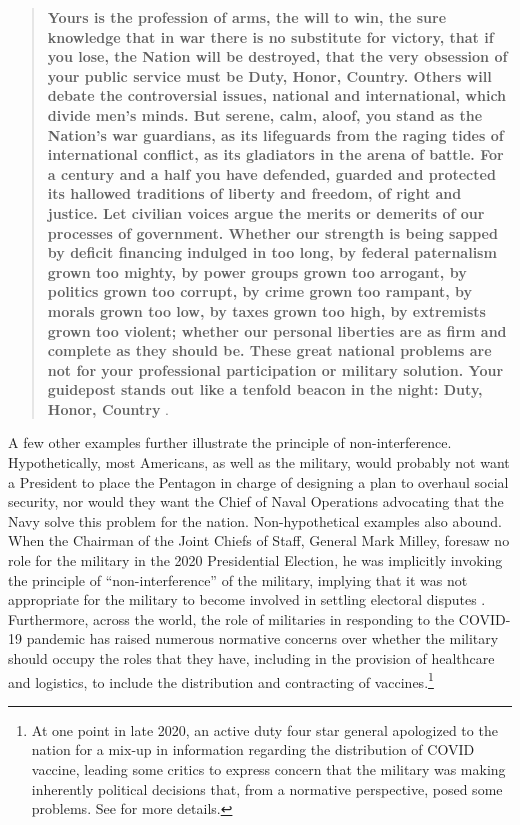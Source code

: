 \documentclass[
  12pt,
  oneside]{memoir}
\begin{document}
\begin{quote}
\textbf{Yours is the profession of arms, the will to win, the sure knowledge that in war there is no substitute for victory, that if you lose, the Nation will be destroyed, that the very obsession of your public service must be Duty, Honor, Country. Others will debate the controversial issues, national and international, which divide men's minds. But serene, calm, aloof, you stand as the Nation's war guardians, as its lifeguards from the raging tides of international conflict, as its gladiators in the arena of battle. For a century and a half you have defended, guarded and protected its hallowed traditions of liberty and freedom, of right and justice. Let civilian voices argue the merits or demerits of our processes of government. Whether our strength is being sapped by deficit financing indulged in too long, by federal paternalism grown too mighty, by power groups grown too arrogant, by politics grown too corrupt, by crime grown too rampant, by morals grown too low, by taxes grown too high, by extremists grown too violent; whether our personal liberties are as firm and complete as they should be. These great national problems are not for your professional participation or military solution. Your guidepost stands out like a tenfold beacon in the night: Duty, Honor, Country} \autocite{macarthur_duty_1962}.
\end{quote}

\DoubleSpacing

A few other examples further illustrate the principle of non-interference. Hypothetically, most Americans, as well as the military, would probably not want a President to place the Pentagon in charge of designing a plan to overhaul social security, nor would they want the Chief of Naval Operations advocating that the Navy solve this problem for the nation. Non-hypothetical examples also abound. When the Chairman of the Joint Chiefs of Staff, General Mark Milley, foresaw no role for the military in the 2020 Presidential Election, he was implicitly invoking the principle of ``non-interference'' of the military, implying that it was not appropriate for the military to become involved in settling electoral disputes \autocite{silva_gen_2020}. Furthermore, across the world, the role of militaries in responding to the COVID-19 pandemic has raised numerous normative concerns over whether the military should occupy the roles that they have, including in the provision of healthcare and logistics, to include the distribution and contracting of vaccines.\footnote{At one point in late 2020, an active duty four star general apologized to the nation for a mix-up in information regarding the distribution of COVID vaccine, leading some critics to express concern that the military was making inherently political decisions that, from a normative perspective, posed some problems. See \textcite{passy_gen_2020} for more details.}
\end{document}
